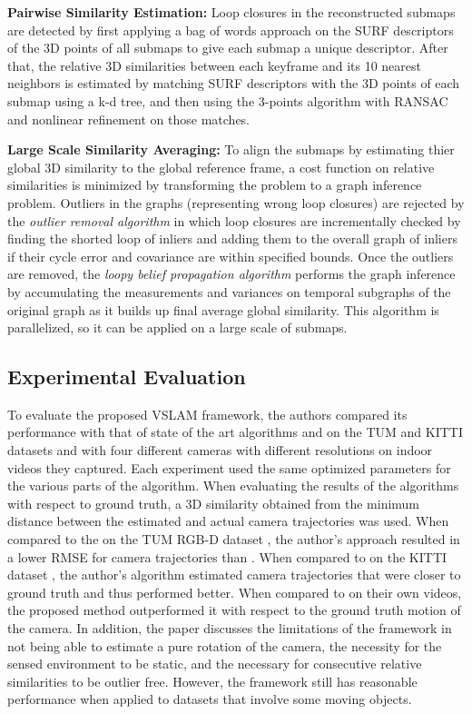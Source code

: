 \documentclass[10pt,twocolumn,letterpaper]{article}
\begin{document}
\textbf{Pairwise Similarity Estimation:} Loop closures in the reconstructed submaps are 
detected by first applying a bag of words approach on the SURF descriptors of the 3D 
points of all submaps to give each submap a unique descriptor. After that, the relative 
3D similarities between each keyframe and its 10 nearest neighbors is estimated by 
matching SURF descriptors with the 3D points of each submap using a k-d tree, 
and then using the 3-points algorithm \cite{17} with RANSAC and nonlinear refinement on 
those matches.

\textbf{Large Scale Similarity Averaging:} To align the submaps by 
estimating thier global 3D similarity to the global reference frame, a cost function on relative 
similarities is minimized by transforming the problem to a graph inference problem. 
Outliers in the graphs (representing wrong loop closures) are rejected by the 
\textit{outlier removal algorithm} \cite{Bourmaud_2015_CVPR} in which loop closures are incrementally checked 
by finding the shorted loop of inliers and adding them to the overall graph of inliers 
if their cycle error and covariance are within specified bounds. 
Once the outliers are removed, the \textit{loopy belief propagation algorithm} \cite{Bourmaud_2015_CVPR} performs the 
graph inference by accumulating the measurements and variances on temporal 
subgraphs of the original graph as it builds up final average global similarity. 
This algorithm is parallelized, so it can be applied on a large scale of submaps.

\subsection{Experimental Evaluation}
To evaluate the proposed VSLAM framework, the authors compared its performance 
with that of state of the art algorithms \cite{10} and \cite{12} on the TUM and KITTI datasets and 
with four different cameras with different resolutions on indoor videos they captured. 
Each experiment used the same optimized parameters for the various parts of the algorithm. 
When evaluating the results of the algorithms with respect to ground truth, a 3D similarity 
obtained from the minimum distance between the estimated and actual camera trajectories 
was used. When compared to the \cite{10} on the TUM RGB-D dataset \cite{29}, the author's approach 
resulted in a 
lower RMSE for camera trajectories than \cite{10}. 
When compared to \cite{12} on the KITTI dataset \cite{mv31}, 
the author's algorithm estimated camera trajectories that were closer to ground truth and 
thus performed better. When compared to \cite{10} on their own videos, the proposed 
method outperformed it with respect to the ground truth motion of the camera. 
In addition, the paper discusses the limitations of the framework in not being able to 
estimate a pure rotation of the camera, the necessity for the sensed environment 
to be static, and the necessary for consecutive relative similarities to be outlier free. 
However, the framework still has reasonable performance when applied to datasets 
that involve some moving objects.
\end{document}
